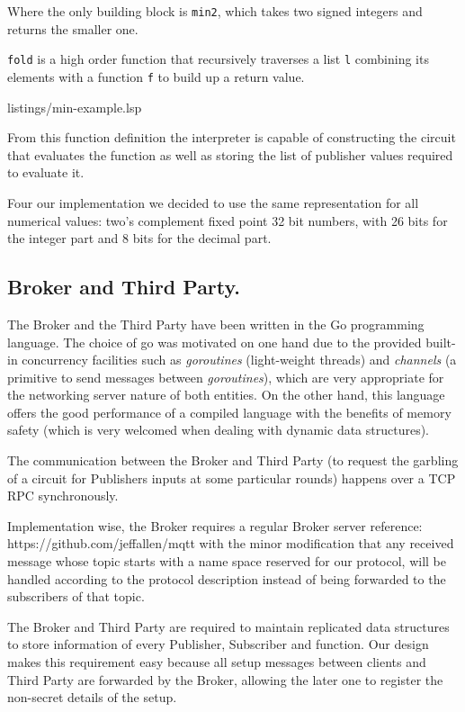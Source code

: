 Where the only \libgarble{} building block is \texttt{min2}, which takes two
signed integers and returns the smaller one.

\texttt{fold} is a high order function that recursively traverses a list
\texttt{l} combining its elements with a function \texttt{f} to build up a
return value.

\begin{minipage}{\linewidth}

{listings/min-example.lsp}
\end{minipage}

From this function definition the interpreter is capable of constructing the
circuit that evaluates the function as well as storing the list of publisher
values required to evaluate it.

Four our implementation we decided to use the same representation for all
numerical values: two's complement fixed point 32 bit numbers, with 26 bits for
the integer part and 8 bits for the decimal part.

\subsection{Broker and Third Party.}

The Broker and the Third Party have been written in the Go programming
language.  The choice of go was motivated on one hand due to the provided
built-in concurrency facilities such as \emph{goroutines} (light-weight
threads) and \emph{channels} (a primitive to send messages between
\emph{goroutines}), which are very appropriate for the networking server nature
of both entities.  On the other hand, this language offers the good performance
of a compiled language with the benefits of memory safety (which is very
welcomed when dealing with dynamic data structures).

The communication between the Broker and Third Party (to request the garbling
of a circuit for Publishers inputs at some particular rounds) happens over a
TCP RPC synchronously.

Implementation wise, the Broker requires a regular \MQTT{} Broker server
{reference: https://github.com/jeffallen/mqtt} with the minor modification that
any received message whose topic starts with a name space reserved for our
protocol, will be handled according to the protocol description instead of
being forwarded to the subscribers of that topic.

The Broker and Third Party are required to maintain replicated data structures
to store information of every Publisher, Subscriber and function.  Our design
makes this requirement easy because all setup messages between clients and
Third Party are forwarded by the Broker, allowing the later one to register the
non-secret details of the setup.

